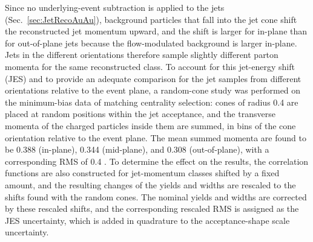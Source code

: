 Since no underlying-event subtraction is applied to the jets (Sec.~\ref{sec:JetRecoAuAu}), background particles that fall into the jet cone shift the reconstructed jet momentum upward, and the shift is larger for in-plane than for out-of-plane jets because the flow-modulated background is larger in-plane.
%
Jets in the different orientations therefore sample slightly different parton momenta for the same reconstructed  class.
%
To account for this jet-energy shift (JES) and to provide an adequate comparison for the jet samples from different orientations relative to the event plane, a random-cone study was performed on the minimum-bias data of matching centrality selection: cones of radius 0.4 are placed at random positions within the jet acceptance, and the transverse momenta of the charged particles inside them are summed, in bins of the cone orientation relative to the event plane.
%
The mean summed momenta are found to be 0.388 \GeVc (in-plane), 0.344 \GeVc (mid-plane), and 0.308 \GeVc (out-of-plane), with a corresponding RMS of 0.4 \GeVc.
%
To determine the effect on the results, the correlation functions are also constructed for jet-momentum classes shifted by a fixed amount, and the resulting changes of the yields and widths are rescaled to the shifts found with the random cones.
%
The nominal yields and widths are corrected by these rescaled shifts, and the corresponding rescaled RMS is assigned as the JES uncertainty, which is added in quadrature to the acceptance-shape scale uncertainty.



